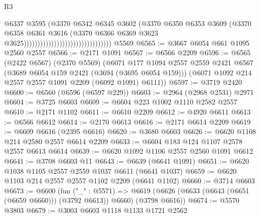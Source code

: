 \begin{lexlean}{R3}
\begin{coremodule}
                                                            @6337
                                                            @3595
                                                            (@3370
                                                              @6342
                                                              @6345
                                                              @3602
                                                              (@3370
                                                                @6350
                                                                @6353
                                                                @3609
                                                                (@3370
                                                                  @6358
                                                                  @6361
                                                                  @3616
                                                                  (@3370
                                                                    @6366
                                                                    @6369
                                                                    @3623
                                                                    @3625))))))))))))))))))))))))))))))))
    @5569
@6565 := @3667 @6054 @661 @1095 @2560 @2557
@6566 := @2171 @1091
@6567 := @6566 @2209
@6596 := @6565
    (@2422 @6567)
    (@2370 @5569)
    (@6071
      @177
      @1094
      @2557
      @2559
      @2421
      @6567
      (@3689 @6054 @159 @2421 (@3694 (@3695 @6054 @159)))
      (@6071 @1092 @214 @2557 @2557 @1091 @2209 (@6092 @1091) @6111))
@6597 := @3719 @2420
@6600 := @6560 (@6596 (@6597 @229))
@6603 := @2964 (@2968 @2531) @2971
@6604 := @3725 @6603
@6609 := @6604 @223 @1002 @1110 @2582 @2557
@6610 := @2171 @1102
@6611 := @6610 @2209
@6612 := @4920 @6611
@6613 := @6566 @6612
@6614 := @2170 @6613
@6616 := @2171 @6614 @2209
@6619 := @6609 @6616 (@2395 @6616)
@6620 := @3680 @6603
@6626 := @6620 @1108 @214 @2580 @2557 @6614 @2209
@6633 := @6604 @183 @124 @1107 @2578 @2557 @6613 @6614
@6639 := @6620 @1092 @1106 @2557 @2560 @1091 @6612
@6641 := @3708 @6603 @11
@6643 := @6639 (@6641 @1091)
@6651 := @6620 @1038 @1105 @2557 @2559 @1037 @6611 (@6641 @1037)
@6659 := @6620 @1103 @214 @2557 @2557 @1102 @2209 (@6641 @1102)
@6660 := @3714 @6603
@6673 := @6600
    (fun ("_" : @5571) =>
    @6619 (@6626 (@6633 (@6643 (@6651 (@6659 @6660))) (@3792 @6613)) @6660) (@3798 @6616))
@6674 := @5570 @3803
@6679 := @3003 @6603 @1118 @1133 @1721 @2562

\end{coremodule}
\end{lexlean}
